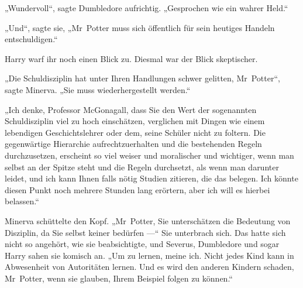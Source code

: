 „Wundervoll“, sagte Dumbledore aufrichtig.
„Gesprochen wie ein wahrer Held.“

„Und“, sagte sie,
„Mr~Potter muss sich öffentlich für sein heutiges Handeln entschuldigen.“

Harry warf ihr noch einen Blick zu. Diesmal war der Blick skeptischer.

„Die Schuldisziplin hat unter Ihren Handlungen schwer gelitten, Mr~Potter“, sagte Minerva.
„Sie muss wiederhergestellt werden.“

„Ich denke, Professor McGonagall, dass Sie den Wert der sogenannten Schuldisziplin viel zu hoch einschätzen, verglichen mit Dingen wie einem lebendigen Geschichtslehrer oder dem, seine Schüler nicht zu foltern. Die gegenwärtige Hierarchie aufrechtzuerhalten und die bestehenden Regeln durchzusetzen, erscheint so viel weiser und moralischer und wichtiger, wenn man selbst an der Spitze steht und die Regeln durchsetzt, als wenn man darunter leidet, und ich kann Ihnen falls nötig Studien zitieren, die das belegen. Ich könnte diesen Punkt noch mehrere Stunden lang erörtern, aber ich will es hierbei belassen.“

Minerva schüttelte den Kopf.
„Mr~Potter, Sie unterschätzen die Bedeutung von Disziplin, da Sie selbst keiner bedürfen —“ Sie unterbrach sich. Das hatte sich nicht so angehört, wie sie beabsichtigte, und Severus, Dumbledore und sogar Harry sahen sie komisch an.
„Um zu lernen, meine ich. Nicht jedes Kind kann in Abwesenheit von Autoritäten lernen. Und es wird den anderen Kindern schaden, Mr~Potter, wenn sie glauben, Ihrem Beispiel folgen zu können.“


